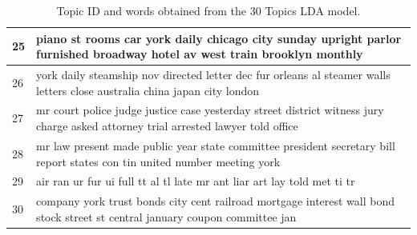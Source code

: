 \documentclass{beamer}
\begin{document}
\begin{frame}
{\begin{minipage}{1.53846\textwidth}
\begin{table}
\begin{tabular}{|p{1cm}|p{16cm}|}
    25       & piano st rooms car york daily chicago city sunday upright parlor furnished broadway hotel av west train brooklyn monthly                              \\ \hline
    26       & york daily steamship nov directed letter dec fur orleans al steamer walls letters close australia china japan city london                             \\ \hline
    27       & mr court police judge justice case yesterday street district witness jury charge asked attorney trial arrested lawyer told office                     \\ \hline
    28       & mr law present made public year state committee president secretary bill report states con tin united number meeting york                             \\ \hline
    29       & air ran ur fur ui full tt al tl late mr ant liar art lay told met ti tr                                                                               \\ \hline
    30       & company york trust bonds city cent railroad mortgage interest wall bond stock street st central january coupon committee jan                          \\ \hline
    \end{tabular}
\caption{ Topic ID and words obtained from the 30 Topics LDA model.}
\end{table}
\end{minipage}}
\end{frame}
\end{document}
